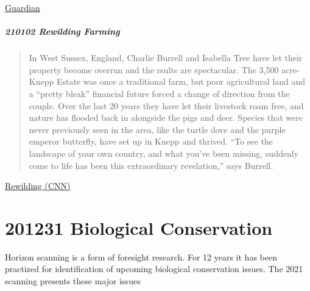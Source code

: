 \documentclass[
]{book}
\begin{document}
\href{https://www.theguardian.com/world/2021/jan/14/carbon-neutrality-is-a-fairy-tale-how-the-race-for-renewables-is-burning-europes-forests}{Guardian}

\hypertarget{rewilding-farming}{%
\subparagraph{210102 Rewilding Farming}\label{rewilding-farming}}

\begin{quote}
In West Sussex, England, Charlie Burrell and Isabella Tree have let their property become overrun
and the rsults are spectacular.
The 3,500 acre-Knepp Estate was once a traditional farm, but poor agricultural land and
a ``pretty bleak'' financial future forced a change of direction from the couple.
Over the last 20 years they have let their livestock roam free, and nature has flooded
back in alongside the pigs and deer.
Species that were never previously seen in the area, like the turtle dove and
the purple emperor butterfly, have set up in Knepp and thrived.
``To see the landscape of your own country, and what you've been missing, suddenly come to life has been this extraordinary revelation,'' says Burrell.
\end{quote}

\href{https://edition.cnn.com/2020/10/01/world/knepp-farm-rewilding-scn-cte-spc/index.html}{Rewilding (CNN)}

\hypertarget{biological-conservation}{%
\section{201231 Biological Conservation}\label{biological-conservation}}

Horizon scanning is a form of foresight research.
For 12 years it has been practized for identification of upcoming
biological conservation issues.
The 2021 scanning presents these major issues
\end{document}
